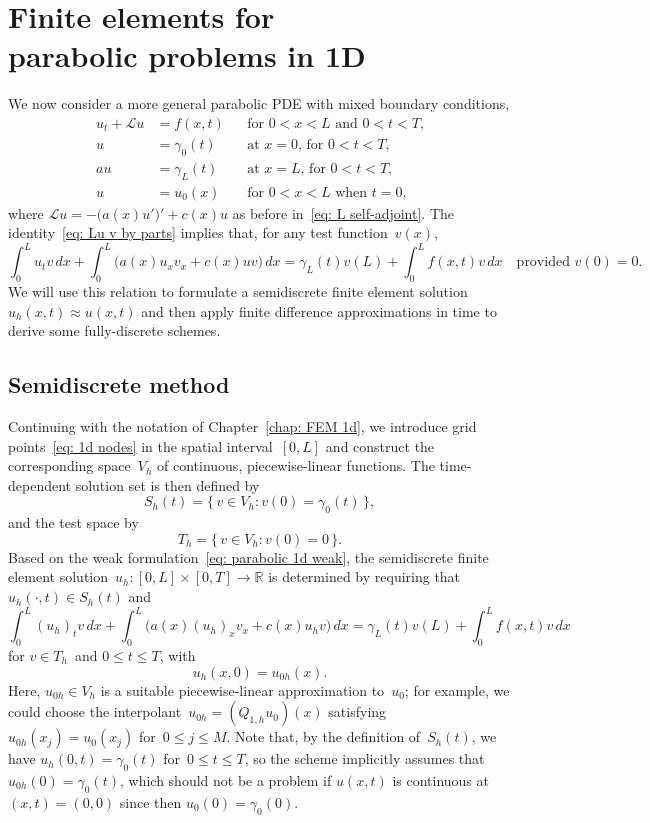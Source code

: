 \chapter[Finite elements for parabolic problems]{Finite elements for \\
parabolic problems in 1D}

We now consider a more general parabolic PDE with mixed boundary conditions,
\begin{equation}\label{eq: parabolic ivp 1d}
\begin{aligned}
u_t+\mathcal{L}u&=f(x,t)&&\text{for $0<x<L$ and $0<t<T$,}\\
u&=\gamma_0(t)&&\text{at $x=0$, for $0<t<T$,}\\
au&=\gamma_L(t)&&\text{at $x=L$, for $0<t<T$,}\\
u&=u_0(x)&&\text{for $0<x<L$ when $t=0$,}
\end{aligned}
\end{equation}
where $\mathcal{L}u=-\bigl(a(x)u'\bigr)'+c(x)u$ as before 
in~\eqref{eq: L self-adjoint}.  The identity~\eqref{eq: Lu v by parts} implies 
that, for any test function~$v(x)$,
\begin{equation}\label{eq: parabolic 1d weak}
\int_0^Lu_tv\,dx+\int_0^L\bigl(a(x)u_xv_x+c(x)uv\bigr)\,dx
	=\gamma_L(t)v(L)+\int_0^Lf(x,t)v\,dx
\quad\text{provided $v(0)=0$.}
\end{equation}
We will use this relation to formulate a semidiscrete finite element 
solution~$u_h(x,t)\approx u(x,t)$ and then apply finite difference 
approximations in time to derive some fully-discrete schemes.

\section{Semidiscrete method}

Continuing with the notation of Chapter~\ref{chap: FEM 1d}, we introduce grid 
points~\eqref{eq: 1d nodes} in the spatial interval~$[0,L]$ and construct the 
corresponding space~$V_h$ of continuous, piecewise-linear functions.  The 
time-dependent solution set is then defined by
\[
S_h(t)=\{\,v\in V_h: v(0)=\gamma_0(t)\,\},
\]
and the test space by
\[
T_h=\{\,v\in V_h: v(0)=0\,\}.
\]
Based on the weak formulation~\eqref{eq: parabolic 1d weak}, the semidiscrete 
finite element solution~$u_h:[0,L]\times[0,T]\to\mathbb{R}$ is determined by 
requiring that $u_h(\cdot,t)\in S_h(t)$ and
\begin{equation}\label{eq: parabolic 1d semidiscrete}
\int_0^L(u_h)_tv\,dx+\int_0^L\bigl(a(x)(u_h)_xv_x+c(x)u_hv\bigr)\,dx
	=\gamma_L(t)v(L)+\int_0^Lf(x,t)v\,dx
\end{equation}
for $v\in T_h$~and $0\le t\le T$, with 
\[
u_h(x,0)=u_{0h}(x).  
\] 
Here, $u_{0h}\in V_h$ is a suitable piecewise-linear approximation to~$u_0$; 
for example, we could choose the interpolant~$u_{0h}=(Q_{1,h}u_0)(x)$ 
satisfying $u_{0h}(x_j)=u_0(x_j)$ for~$0\le j\le M$.  Note that, by the 
definition of~$S_h(t)$, we have $u_h(0,t)=\gamma_0(t)$ for~$0\le t\le T$, so the 
scheme implicitly assumes that $u_{0h}(0)=\gamma_0(t)$, which should not be a 
problem if $u(x,t)$ is continuous at~$(x,t)=(0,0)$ since then 
$u_0(0)=\gamma_0(0)$.

